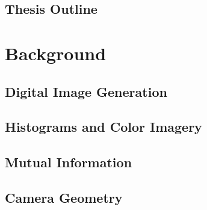 \documentclass[11pt]{report}
\begin{document}
\begin{doublespace}
\section{Thesis Outline}

\indent





\chapter{Background}
\label{Ch:Background}

\indent


%
%

\section{Digital Image Generation}

\indent



\section{Histograms and Color Imagery}

\indent



\section{Mutual Information}

\indent



\section{Camera Geometry}


\end{doublespace}
\end{document}
